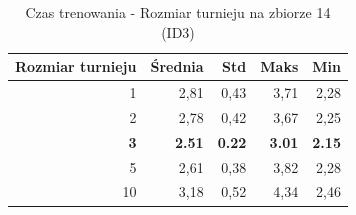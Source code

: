\begin{table}[htbp]
\centering
\small
\setlength{\tabcolsep}{6pt}
\renewcommand{\arraystretch}{1.2}
\caption{Czas trenowania - Rozmiar turnieju na zbiorze 14 (ID3)}
\label{tab:ID3_tournament_size_14_time}
\begin{tabular}{r|r|r|r|r}
\toprule
Rozmiar turnieju & Średnia & Std & Maks & Min \\
\hline
1 & 2,81 & 0,43 & 3,71 & 2,28 \\
2 & 2,78 & 0,42 & 3,67 & 2,25 \\
\textbf{3} & \textbf{2.51} & \textbf{0.22} & \textbf{3.01} & \textbf{2.15} \\
5 & 2,61 & 0,38 & 3,82 & 2,28 \\
10 & 3,18 & 0,52 & 4,34 & 2,46 \\
\bottomrule
\end{tabular}
\end{table}
